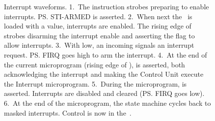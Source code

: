 \begin{figure}
  \centering
  \caption[CFT Processor Interrupt
    Waveforms]{\label{hard:proc:interrupt-waveforms}Interrupt waveforms. 1.~The
     instruction strobes  preparing to enable
    interrupts. \ps{STI-ARMED} is asserted. 2.~When next the \PC~is loaded with
    a value, interrupts are enabled. The rising edge of  strobes
     disarming the interrupt enable and asserting the 
    flag to allow interrupts. 3.~With  low, an incoming 
    signals an interrupt request. \ps{FIRQ} goes high to arm the
    interrupt. 4.~At the end of the current microprogram (rising edge of
    ),  is asserted, both acknowledging the interrupt and
    making the Control Unit execute the Interrupt microprogram. 5.~During the
    microprogram,  is asserted. Interrupts are disabled and cleared
    (\ps{FIRQ} goes low). 6.~At the end of the microprogram, the state machine
    cycles back to masked interrupts. Control is now in the~.}
\end{figure}








